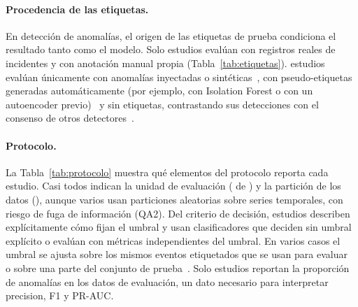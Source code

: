 \documentclass[12pt, a4paper]{article}
\begin{document}


\paragraph{Procedencia de las etiquetas.} En detecci\'{o}n de anomal\'{i}as, el origen de las etiquetas de prueba condiciona el resultado tanto como el modelo. Solo \NetiqReal{} estudios eval\'{u}an con registros reales de incidentes y \NetiqManual{} con anotaci\'{o}n manual propia (Tabla~\ref{tab:etiquetas}). \NetiqInyect{} estudios eval\'{u}an \'{u}nicamente con anomal\'{i}as inyectadas o sint\'{e}ticas~\cite{hu2022detecting,ren2024graph,wang2024multiscale,park2025graph}, \NetiqMixto{} con pseudo-etiquetas generadas autom\'{a}ticamente (por ejemplo, con Isolation Forest o con un autoencoder previo)~\cite{abdallah2025aipurban,duan2025multimodal,jadhav2026multistage} y \NetiqSin{} sin etiquetas, contrastando sus detecciones con el consenso de otros detectores~\cite{jia2025prediction}.



\paragraph{Protocolo.} La Tabla~\ref{tab:protocolo} muestra qu\'{e} elementos del protocolo reporta cada estudio. Casi todos indican la unidad de evaluaci\'{o}n (\Nunidad{} de \Nestudios) y la partici\'{o}n de los datos (\Nparticion), aunque varios usan particiones aleatorias sobre series temporales, con riesgo de fuga de informaci\'{o}n (QA2). Del criterio de decisi\'{o}n, \NumbralExplicito{} estudios describen expl\'{i}citamente c\'{o}mo fijan el umbral y \NumbralNoAplica{} usan clasificadores que deciden sin umbral expl\'{i}cito o eval\'{u}an con m\'{e}tricas independientes del umbral. En varios casos el umbral se ajusta sobre los mismos eventos etiquetados que se usan para evaluar~\cite{cai2021road} o sobre una parte del conjunto de prueba~\cite{chakraborty2023structural}. Solo \Ntasa{} estudios reportan la proporci\'{o}n de anomal\'{i}as en los datos de evaluaci\'{o}n, un dato necesario para interpretar precision, F1 y PR-AUC.


\end{document}
